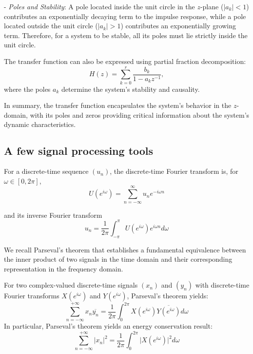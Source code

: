 - \textit{Poles and Stability}: A pole located inside the unit circle in the \(z\)-plane (\(\vert a_k \vert < 1\)) contributes an exponentially decaying term to the impulse response, while a pole located outside the unit circle (\(\vert a_k \vert > 1\)) contributes an exponentially growing term. Therefore, for a system to be stable, all its poles must lie strictly inside the unit circle.

The transfer function can also be expressed using partial fraction decomposition:
\begin{equation}
H(z) = \sum_{k=0}^r \frac{b_k}{1 - a_k z^{-1}},
\label{appendix partial fraction decomposition}
\end{equation}
where the poles \(a_k\) determine the system's stability and causality.

In summary, the transfer function encapsulates the system's behavior in the \(z\)-domain, with its poles and zeros providing critical information about the system's dynamic characteristics.




\subsection{A few signal processing tools}

\begin{definition}
    For a discrete-time sequence $(u_n)$, the discrete-time Fourier transform is, for $\omega\in[0, 2\pi]$,
    \begin{equation}
          U(e^{i\omega})=\sum_{n=-\infty}^\infty u_ne^{-i\omega n}  
    \label{DTFT}
    \end{equation}

    and its inverse Fourier transform 
    \begin{equation}
    u_n = \frac{1}{2\pi}\int_{-\pi}^\pi U(e^{i\omega})e^{i\omega n}d\omega
    \label{inverse DTFT}
    \end{equation}
    
\end{definition}

We recall Parseval's theorem that establishes a fundamental equivalence between the inner product of two signals in the time domain and their corresponding representation in the frequency domain.

\begin{definition}
    For two complex-valued discrete-time signals \((x_n)\) and \((y_n)\) with discrete-time Fourier transforms \(X(e^{i\omega})\) and \(Y(e^{i\omega})\), Parseval's theorem yields:
    \begin{equation}
        \sum_{n=-\infty}^{+\infty}x_n\overline{y_n} = \frac{1}{2\pi}\int_0^{2\pi}X(e^{i\omega})\overline{Y(e^{i\omega})}d\omega
        \label{Parseval thm}
    \end{equation}
In particular, Parseval's theorem yields an energy conservation result:
    \begin{equation*}
        \sum_{n=-\infty}^{+\infty}\vert x_n\vert^2 = \frac{1}{2\pi}\int_0^{2\pi}\vert X(e^{i\omega})\vert^2 d\omega
    \end{equation*}
\end{definition}

